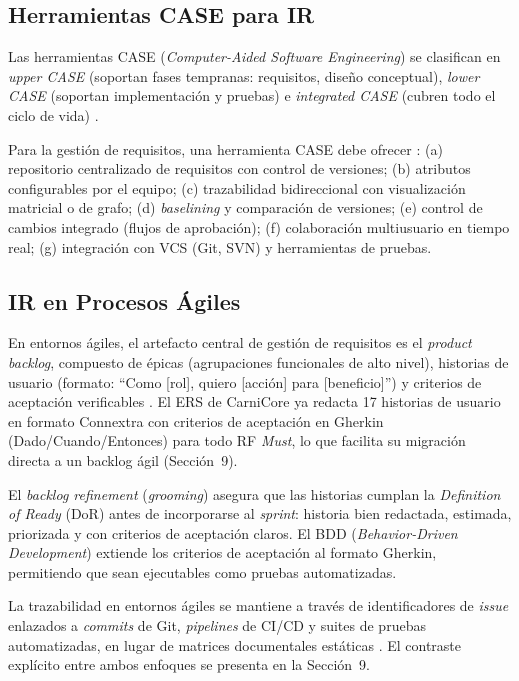\documentclass[11pt,a4paper]{article}
\begin{document}
\subsection{Herramientas CASE para IR}
Las herramientas CASE (\textit{Computer-Aided Software Engineering}) se clasifican en \textit{upper
CASE} (soportan fases tempranas: requisitos, diseño conceptual), \textit{lower CASE} (soportan
implementación y pruebas) e \textit{integrated CASE} (cubren todo el ciclo de vida) \cite{swebok2024}.

Para la gestión de requisitos, una herramienta CASE debe ofrecer \cite{pohl2010}: (a) repositorio
centralizado de requisitos con control de versiones; (b) atributos configurables por el
equipo; (c) trazabilidad bidireccional con visualización matricial o de grafo; (d) \textit{baselining}
y comparación de versiones; (e) control de cambios integrado (flujos de aprobación);
(f) colaboración multiusuario en tiempo real; (g) integración con VCS (Git, SVN) y
herramientas de pruebas.

\subsection{IR en Procesos Ágiles}
En entornos ágiles, el artefacto central de gestión de requisitos es el \textit{product backlog},
compuesto de épicas (agrupaciones funcionales de alto nivel), historias de usuario (formato: “Como [rol], quiero [acción] para [beneficio]”) y criterios de aceptación verificables
\cite{cohn2004}. El ERS de CarniCore ya redacta 17 historias de usuario en formato Connextra con criterios de aceptación en Gherkin (Dado/Cuando/Entonces) para todo RF \textit{Must}, lo que facilita su migración directa a un backlog ágil (Sección~9).

El \textit{backlog refinement} (\textit{grooming}) asegura que las historias cumplan la \textit{Definition of
Ready} (DoR) antes de incorporarse al \textit{sprint}: historia bien redactada, estimada, priorizada
y con criterios de aceptación claros. El BDD (\textit{Behavior-Driven Development}) \cite{smart2014} extiende los criterios de aceptación al
formato Gherkin, permitiendo que sean ejecutables como pruebas automatizadas.

La trazabilidad en entornos ágiles se mantiene a través de identificadores de \textit{issue}
enlazados a \textit{commits} de Git, \textit{pipelines} de CI/CD y suites de pruebas automatizadas, en
lugar de matrices documentales estáticas \cite{cleland2012}. El contraste explícito entre ambos enfoques
se presenta en la Sección~9.
\end{document}
